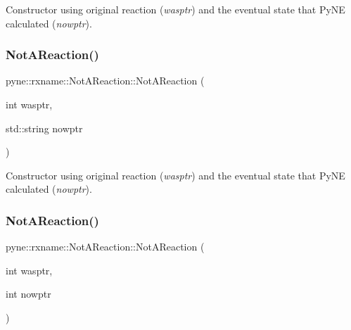 Constructor using original reaction ({\itshape wasptr}) and the eventual state that Py\+NE calculated ({\itshape nowptr}). \mbox{\label{classpyne_1_1rxname_1_1_not_a_reaction_a828c48bf08dd96121ec83c6cced3063b}} 
\subsubsection{\texorpdfstring{Not\+A\+Reaction()}{NotAReaction()}\hspace{0.1cm}{\footnotesize\ttfamily [3/7]}}
{\footnotesize\ttfamily pyne\+::rxname\+::\+Not\+A\+Reaction\+::\+Not\+A\+Reaction (\begin{DoxyParamCaption}\item[{int}]{wasptr,  }\item[{std\+::string}]{nowptr }\end{DoxyParamCaption})\hspace{0.3cm}{\ttfamily [inline]}}

Constructor using original reaction ({\itshape wasptr}) and the eventual state that Py\+NE calculated ({\itshape nowptr}). \mbox{\label{classpyne_1_1rxname_1_1_not_a_reaction_a8d16f260eab4fbbc7a5a14b48ce5580d}} 
\subsubsection{\texorpdfstring{Not\+A\+Reaction()}{NotAReaction()}\hspace{0.1cm}{\footnotesize\ttfamily [4/7]}}
{\footnotesize\ttfamily pyne\+::rxname\+::\+Not\+A\+Reaction\+::\+Not\+A\+Reaction (\begin{DoxyParamCaption}\item[{int}]{wasptr,  }\item[{int}]{nowptr }\end{DoxyParamCaption})\hspace{0.3cm}{\ttfamily [inline]}}

